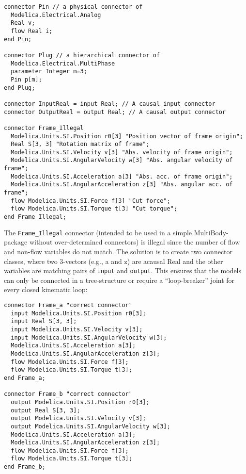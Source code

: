 \begin{example}
\begin{lstlisting}[language=modelica]
connector Pin // a physical connector of
  Modelica.Electrical.Analog
  Real v;
  flow Real i;
end Pin;

connector Plug // a hierarchical connector of
  Modelica.Electrical.MultiPhase
  parameter Integer m=3;
  Pin p[m];
end Plug;

connector InputReal = input Real; // A causal input connector
connector OutputReal = output Real; // A causal output connector

connector Frame_Illegal
  Modelica.Units.SI.Position r0[3] "Position vector of frame origin";
  Real S[3, 3] "Rotation matrix of frame";
  Modelica.Units.SI.Velocity v[3] "Abs. velocity of frame origin";
  Modelica.Units.SI.AngularVelocity w[3] "Abs. angular velocity of frame";
  Modelica.Units.SI.Acceleration a[3] "Abs. acc. of frame origin";
  Modelica.Units.SI.AngularAcceleration z[3] "Abs. angular acc. of frame";
  flow Modelica.Units.SI.Force f[3] "Cut force";
  flow Modelica.Units.SI.Torque t[3] "Cut torque";
end Frame_Illegal;
\end{lstlisting}

The \lstinline!Frame_Illegal! connector (intended to be used in a
simple MultiBody-package without over-determined connectors) is illegal
since the number of flow and non-flow variables do not match. The
solution is to create two connector classes, where two 3-vectors (e.g.,
a and z) are acausal Real and the other variables are matching pairs of
\lstinline!input! and \lstinline!output!. This ensures that the models can only be
connected in a tree-structure or require a ``loop-breaker'' joint for
every closed kinematic loop:
\begin{lstlisting}[language=modelica]
connector Frame_a "correct connector"
  input Modelica.Units.SI.Position r0[3];
  input Real S[3, 3];
  input Modelica.Units.SI.Velocity v[3];
  input Modelica.Units.SI.AngularVelocity w[3];
  Modelica.Units.SI.Acceleration a[3];
  Modelica.Units.SI.AngularAcceleration z[3];
  flow Modelica.Units.SI.Force f[3];
  flow Modelica.Units.SI.Torque t[3];
end Frame_a;

connector Frame_b "correct connector"
  output Modelica.Units.SI.Position r0[3];
  output Real S[3, 3];
  output Modelica.Units.SI.Velocity v[3];
  output Modelica.Units.SI.AngularVelocity w[3];
  Modelica.Units.SI.Acceleration a[3];
  Modelica.Units.SI.AngularAcceleration z[3];
  flow Modelica.Units.SI.Force f[3];
  flow Modelica.Units.SI.Torque t[3];
end Frame_b;
\end{lstlisting}


\end{example}
